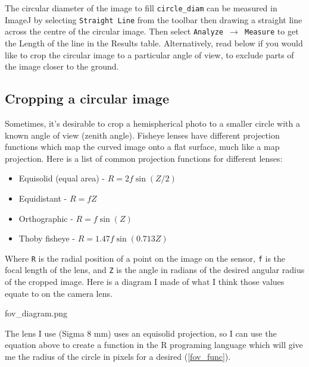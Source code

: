 \documentclass{article}
\begin{document}
The circular diameter of the image to fill \texttt{circle\_diam} can be measured in ImageJ by selecting \texttt{Straight Line} from the toolbar then drawing a straight line across the centre of the circular image. Then select \texttt{Analyze $\rightarrow$ Measure} to get the Length of the line in the Results table. Alternatively, read below if you would like to crop the circular image to a particular angle of view, to exclude parts of the image closer to the ground.

\subsection{Cropping a circular image}

Sometimes, it's desirable to crop a hemispherical photo to a smaller circle with a known angle of view (zenith angle). Fisheye lenses have different projection functions which map the curved image onto a flat surface, much like a map projection. Here is a list of common projection functions for different lenses:

\begin{itemize}
	\item{Equisolid (equal area) - $R = 2f\sin{(Z/2)}$}
	\item{Equidistant - $R = fZ$}
	\item{Orthographic - $R = f\sin{(Z)}$}
	\item{Thoby fisheye - $R = 1.47f\sin{(0.713Z)}$}
\end{itemize}

Where \texttt{R} is the radial position of a point on the image on the sensor, \texttt{f} is the focal length of the lens, and \texttt{Z} is the angle in radians of the desired angular radius of the cropped image. Here is a diagram I made of what I think those values equate to on the camera lens.

fov\_diagram.png

The lens I use (Sigma 8 mm) uses an equisolid projection, so I can use the equation above to create a function in the R programing language which will give me the radius of the circle in pixels for a desired  (\autoref{fov_func}).
\end{document}
